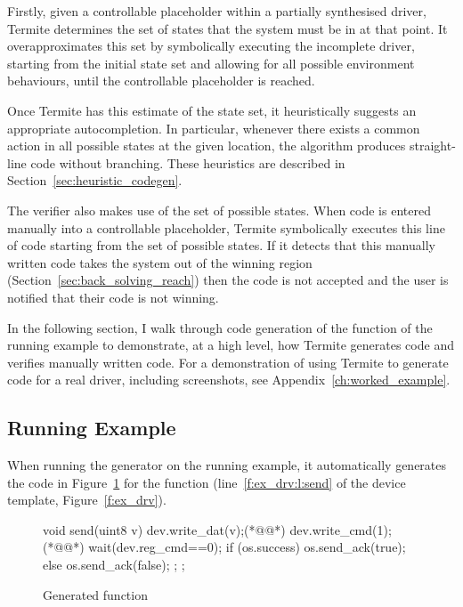 Firstly, given a controllable placeholder within a partially synthesised driver, Termite determines the set of states that the system must be in at that point. It overapproximates this set by symbolically executing the incomplete driver, starting from the initial state set and allowing for all possible environment behaviours, until the controllable placeholder is reached. 

Once Termite has this estimate of the state set, it heuristically suggests an appropriate autocompletion. In particular, whenever there exists a common action in all possible states at the given location, the algorithm produces straight-line code without branching. These heuristics are described in Section~\ref{sec:heuristic_codegen}.

The verifier also makes use of the set of possible states. When code is entered manually into a controllable placeholder, Termite symbolically executes this line of code starting from the set of possible states. If it detects that this manually written code takes the system out of the winning region (Section~\ref{sec:back_solving_reach}) then the code is not accepted and the user is notified that their code is not winning.

In the following section, I walk through code generation of the  function of the running example to demonstrate, at a high level, how Termite generates code and verifies manually written code. For a demonstration of using Termite to generate code for a real driver, including screenshots, see Appendix~\ref{ch:worked_example}.

\subsection{Running Example}
\label{sec:codegen_running_example}

When running the generator on the running example, it automatically generates the code in Figure~\ref{f:ex_gen_send} for the  function (line~\ref{f:ex_drv:l:send} of the device template, Figure~\ref{f:ex_drv}).

\begin{figure}
\begin{tsllisting}
void send(uint8 v){
    dev.write_dat(v);(*@\label{f:ex_synt:l:dat}@*)
    dev.write_cmd(1);(*@\label{f:ex_synt:l:cmd}@*)
    wait(dev.reg_cmd==0);
    if (os.success) {
        os.send_ack(true);
    } else {
        os.send_ack(false);
    };
};
\end{tsllisting}
\caption{Generated  function}
\label{f:ex_gen_send}
\end{figure}

